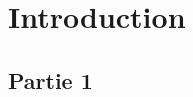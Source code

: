 \documentclass[11pt,a4paper,french]{article}
\begin{document}

\section{Introduction}\label{sec:S_STRU}
\subsection{Partie 1}


	
	






\end{document}
